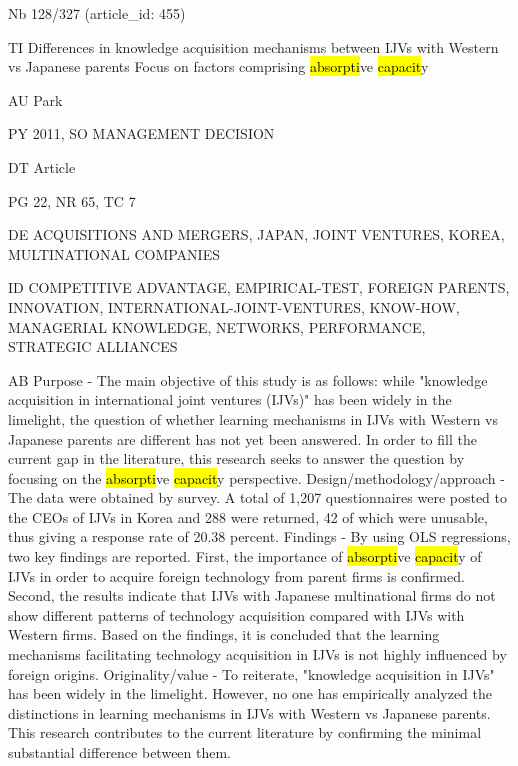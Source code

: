 \documentclass[a4paper]{article}
\begin{document}
\vspace*{-2cm}
Nb \tabto{0cm}128/327 (article\_id: 455)\par
TI \tabto{0cm}Differences in knowledge acquisition mechanisms between IJVs with Western vs Japanese parents Focus on factors comprising \hl{absorpti}ve \hl{capacit}y\par
AU \tabto{0cm}Park\par
PY \tabto{0cm}2011, SO MANAGEMENT DECISION\par
DT \tabto{0cm}Article\par
PG \tabto{0cm}22, NR 65, TC 7\par
DE \tabto{0cm}ACQUISITIONS AND MERGERS, JAPAN, JOINT VENTURES, KOREA, MULTINATIONAL COMPANIES\par
ID \tabto{0cm}COMPETITIVE ADVANTAGE, EMPIRICAL-TEST, FOREIGN PARENTS, INNOVATION, INTERNATIONAL-JOINT-VENTURES, KNOW-HOW, MANAGERIAL KNOWLEDGE, NETWORKS, PERFORMANCE, STRATEGIC ALLIANCES\par
AB \tabto{0cm}Purpose - The main objective of this study is as follows: while "knowledge acquisition in international joint ventures (IJVs)" has been widely in the limelight, the question of whether learning mechanisms in IJVs with Western vs Japanese parents are different has not yet been answered. In order to fill the current gap in the literature, this research seeks to answer the question by focusing on the \hl{absorpti}ve \hl{capacit}y perspective.
Design/methodology/approach - The data were obtained by survey. A total of 1,207 questionnaires were posted to the CEOs of IJVs in Korea and 288 were returned, 42 of which were unusable, thus giving a response rate of 20.38 percent.
Findings - By using OLS regressions, two key findings are reported. First, the importance of \hl{absorpti}ve \hl{capacit}y of IJVs in order to acquire foreign technology from parent firms is confirmed. Second, the results indicate that IJVs with Japanese multinational firms do not show different patterns of technology acquisition compared with IJVs with Western firms. Based on the findings, it is concluded that the learning mechanisms facilitating technology acquisition in IJVs is not highly influenced by foreign origins.
Originality/value - To reiterate, "knowledge acquisition in IJVs" has been widely in the limelight. However, no one has empirically analyzed the distinctions in learning mechanisms in IJVs with Western vs Japanese parents. This research contributes to the current literature by confirming the minimal substantial difference between them.\par
\clearpage
\end{document}
